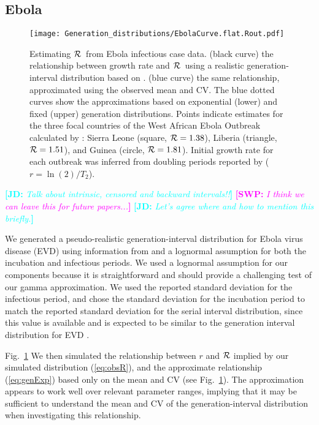 \documentclass[12pt]{article}
\newcommand{\RR}{\ensuremath{{\cal R}}}
\newcommand{\eref}[1]{(\ref{eq:#1})}
\newcommand{\fref}[1]{Fig.~\ref{fig:#1}}
\newcommand{\Fref}[1]{Fig.~\ref{fig:#1}}
\newcommand{\comment}[3]{\textcolor{#1}{\textbf{[#2: }\textit{#3}\textbf{]}}}
\newcommand{\jd}[1]{\comment{cyan}{JD}{#1}}
\newcommand{\swp}[1]{\comment{magenta}{SWP}{#1}}
\begin{document}
\subsection{Ebola}
\label{EbolaEx}

\begin{figure}[htbp] \centering
	\texttt{[image: Generation\_distributions/EbolaCurve.flat.Rout.pdf]}
	\caption{Estimating \RR~from Ebola infectious case data.
(black curve) the relationship between growth rate and \RR~using a realistic generation-interval distribution based on \cite{AylwBarb14}.
(blue curve) the same relationship, approximated using the observed mean and CV. 
The blue dotted curves show the approximations based on exponential (lower) and fixed (upper) generation distributions.
Points indicate estimates for the three focal countries of the West African Ebola Outbreak calculated by \cite{AylwBarb14}: {Sierra Leone (square, $\RR=1.38$), Liberia (triangle, $\RR=1.51$), and Guinea (circle, $\RR=1.81$).} Initial growth rate for each outbreak was inferred from doubling periods reported by \cite{AylwBarb14} ($r = \ln(2)/T_2$).
	\label{fig:EbolaCurve}}
\end{figure}

\jd{Talk about intrinsic, censored and backward intervals!!}
\swp{I think we can leave this for future papers...}
\jd{Let's agree where and how to mention this briefly.}

We generated a pseudo-realistic generation-interval distribution for Ebola virus disease (EVD) using information from \cite{AylwBarb14} and a lognormal assumption for both the incubation and infectious periods.
We used a lognormal assumption for our components because it is straightforward and should provide a challenging test of our gamma approximation. 
We used the reported standard deviation for the infectious period, and chose the standard deviation for the incubation period to match the reported standard deviation for the serial interval distribution, since this value is available and is expected to be similar to the generation interval distribution for EVD \cite{AylwBarb14}.

\Fref{EbolaCurve} We  then simulated the relationship between $r$ and $\RR$ implied by our simulated distribution \eref{obsR}, and the approximate relationship \eref{genExp} based only on the mean and CV (see \fref{EbolaCurve}). The approximation appears to work well over relevant parameter ranges, implying that it may be sufficient to understand the mean and CV of the generation-interval distribution when investigating this relationship.
\end{document}
